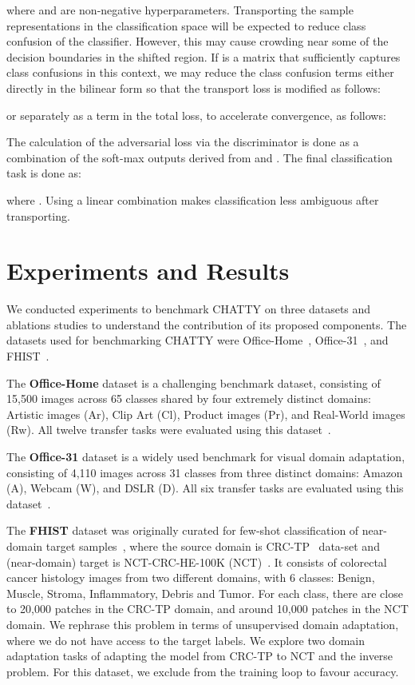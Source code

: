 \documentclass[10pt,twocolumn,letterpaper]{article}
\begin{document}
where  and  are non-negative hyperparameters. Transporting the sample representations in the classification space will be expected to reduce class confusion of the classifier. However, this may cause crowding near some of the decision boundaries in the shifted region. If  is a matrix that sufficiently captures class confusions in this context, we may reduce the class confusion terms either directly in the bilinear form  so that the transport loss is modified as follows:

or separately as a term in the total loss, to accelerate convergence, as follows:


The calculation of the adversarial loss via the discriminator is done as a combination of the soft-max outputs derived from  and . The final classification task is done as:

where . Using a linear combination makes classification less ambiguous after transporting. 


\section{Experiments and Results}

We conducted experiments to benchmark CHATTY on three datasets and ablations studies to understand the contribution of its proposed components. The datasets used for benchmarking CHATTY were Office-Home~\cite{office-home}, Office-31~\cite{office31}, and FHIST~\cite{fhist}. 

The \textbf{Office-Home} dataset is a challenging benchmark dataset, consisting of 15,500 images across 65 classes shared by four extremely distinct domains: Artistic images (Ar), Clip Art (Cl), Product images (Pr), and Real-World images (Rw). All twelve transfer tasks were evaluated using this dataset~\cite{office-home}. 

The \textbf{Office-31} dataset is a widely used benchmark for visual domain adaptation, consisting of 4,110 images across 31 classes from three distinct domains: Amazon (A), Webcam (W), and DSLR (D). All six transfer tasks are evaluated using this dataset~\cite{office31}. 

The \textbf{FHIST} dataset was originally curated for few-shot classification of near-domain target samples~\cite{fhist}, where the source domain is CRC-TP~\cite{crc} data-set and (near-domain) target is NCT-CRC-HE-100K (NCT)~\cite{nct}. It consists of colorectal cancer histology images from two different domains, with 6 classes: Benign, Muscle, Stroma, Inflammatory, Debris and Tumor. For each class, there are close to 20,000 patches in the CRC-TP domain, and around 10,000 patches in the NCT domain. We rephrase this problem in terms of unsupervised domain adaptation, where we do not have access to the target labels. We explore two domain adaptation tasks of adapting the model from CRC-TP to NCT and the inverse problem. For this dataset, we exclude  from the training loop to favour accuracy.
\end{document}
